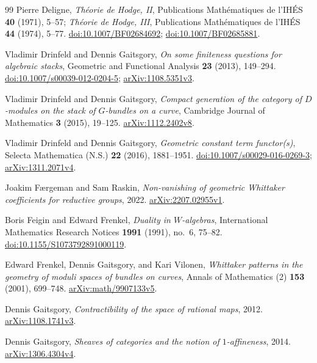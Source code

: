 \begin{thebibliography}{99}
Pierre Deligne,
\emph{Th\'eorie de Hodge, II},
Publications Math\'ematiques de l'IH\'ES \textbf{40} (1971), 5--57;
\emph{Th\'eorie de Hodge, III},
Publications Math\'ematiques de l'IH\'ES \textbf{44} (1974), 5--77.
\href{https://doi.org/10.1007/BF02684692}{doi:10.1007/BF02684692};
\href{https://doi.org/10.1007/BF02685881}{doi:10.1007/BF02685881}.

Vladimir Drinfeld and Dennis Gaitsgory,
\emph{On some finiteness questions for algebraic stacks},
Geometric and Functional Analysis \textbf{23} (2013), 149--294.
\href{https://doi.org/10.1007/s00039-012-0204-5}{doi:10.1007/s00039-012-0204-5};
\href{https://arxiv.org/abs/1108.5351v3}{arXiv:1108.5351v3}.

Vladimir Drinfeld and Dennis Gaitsgory,
\emph{Compact generation of the category of $D$-modules on the stack of
$G$-bundles on a curve},
Cambridge Journal of Mathematics \textbf{3} (2015), 19--125.
\href{https://arxiv.org/abs/1112.2402v8}{arXiv:1112.2402v8}.

Vladimir Drinfeld and Dennis Gaitsgory,
\emph{Geometric constant term functor(s)},
Selecta Mathematica (N.S.) \textbf{22} (2016), 1881--1951.
\href{https://doi.org/10.1007/s00029-016-0269-3}{doi:10.1007/s00029-016-0269-3};
\href{https://arxiv.org/abs/1311.2071v4}{arXiv:1311.2071v4}.

Joakim F\ae rgeman and Sam Raskin,
\emph{Non-vanishing of geometric Whittaker coefficients for reductive groups},
2022.
\href{https://arxiv.org/abs/2207.02955v1}{arXiv:2207.02955v1}.

Boris Feigin and Edward Frenkel,
\emph{Duality in $W$-algebras},
International Mathematics Research Notices \textbf{1991} (1991), no.~6, 75--82.
\href{https://doi.org/10.1155/S1073792891000119}{doi:10.1155/S1073792891000119}.

Edward Frenkel, Dennis Gaitsgory, and Kari Vilonen,
\emph{Whittaker patterns in the geometry of moduli spaces of bundles on curves},
Annals of Mathematics (2) \textbf{153} (2001), 699--748.
\href{https://arxiv.org/abs/math/9907133v5}{arXiv:math/9907133v5}.

Dennis Gaitsgory,
\emph{Contractibility of the space of rational maps}, 2012.
\href{https://arxiv.org/abs/1108.1741v3}{arXiv:1108.1741v3}.

Dennis Gaitsgory,
\emph{Sheaves of categories and the notion of $1$-affineness}, 2014.
\href{https://arxiv.org/abs/1306.4304v4}{arXiv:1306.4304v4}.


\end{thebibliography}
